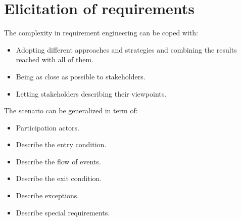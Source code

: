 \documentclass[12pt, a4paper]{report}
\theoremstyle{remark}
\begin{document}
\section{Elicitation of requirements}
    The complexity in requirement engineering can be coped with:
    \begin{itemize}
        \item Adopting different approaches and strategies and combining the results reached with all of them.
        \item Being as close as possible to stakeholders.
        \item Letting stakeholders describing their viewpoints.
    \end{itemize}
    The scenario can be generalized in term of:
    \begin{itemize}
        \item Participation actors.
        \item Describe the entry condition.
        \item Describe the flow of events.
        \item Describe the exit condition.
        \item Describe exceptions.
        \item Describe special requirements.
    \end{itemize}
\end{document}
